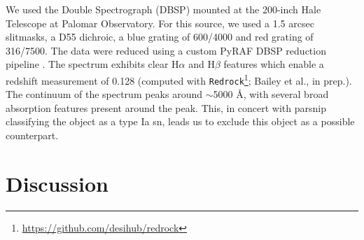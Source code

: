 \documentclass[twocolumn]{aastex631}
\begin{document}
We used the Double Spectrograph (DBSP) mounted at the 200-inch Hale Telescope at Palomar Observatory.
For this source, we used a 1.5 arcsec slitmasks, a D55 dichroic, a blue grating of 600/4000 and red grating of 316/7500.
The data were reduced using a custom PyRAF DBSP reduction pipeline \citep{dbsp}. 
The spectrum exhibits clear H$\alpha$ and H$\beta$ features which enable a redshift measurement of 0.128 (computed with \texttt{Redrock}\footnote{\url{https://github.com/desihub/redrock}}; Bailey et al., in prep.).
The continuum of the spectrum peaks around $\sim$5000 \AA, with several broad absorption features present around the peak.
This, in concert with \gls{parsnip} classifying the object as a type Ia \gls{sn}, leads us to exclude this object as a possible counterpart.

\section{Discussion}
\label{sec:discussion}
\end{document}
